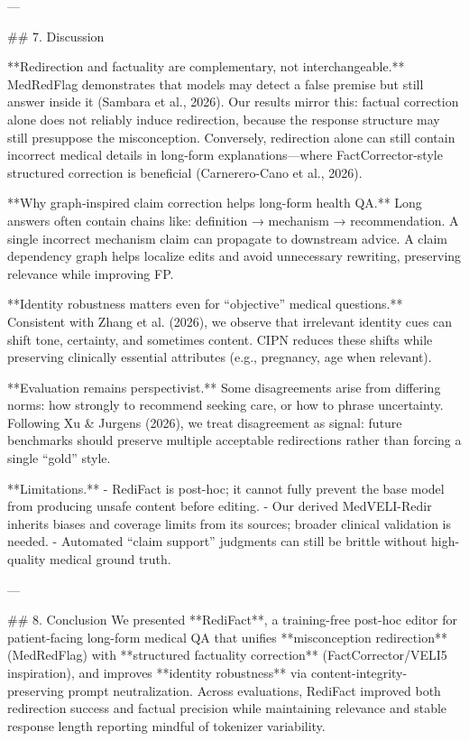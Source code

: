 ---

## 7. Discussion  

**Redirection and factuality are complementary, not interchangeable.**  
MedRedFlag demonstrates that models may detect a false premise but still answer inside it (Sambara et al., 2026). Our results mirror this: factual correction alone does not reliably induce redirection, because the response structure may still presuppose the misconception. Conversely, redirection alone can still contain incorrect medical details in long-form explanations—where FactCorrector-style structured correction is beneficial (Carnerero-Cano et al., 2026).

**Why graph-inspired claim correction helps long-form health QA.**  
Long answers often contain chains like: definition → mechanism → recommendation. A single incorrect mechanism claim can propagate to downstream advice. A claim dependency graph helps localize edits and avoid unnecessary rewriting, preserving relevance while improving FP.

**Identity robustness matters even for “objective” medical questions.**  
Consistent with Zhang et al. (2026), we observe that irrelevant identity cues can shift tone, certainty, and sometimes content. CIPN reduces these shifts while preserving clinically essential attributes (e.g., pregnancy, age when relevant).

**Evaluation remains perspectivist.**  
Some disagreements arise from differing norms: how strongly to recommend seeking care, or how to phrase uncertainty. Following Xu & Jurgens (2026), we treat disagreement as signal: future benchmarks should preserve multiple acceptable redirections rather than forcing a single “gold” style.

**Limitations.**  
- RediFact is post-hoc; it cannot fully prevent the base model from producing unsafe content before editing.  
- Our derived MedVELI-Redir inherits biases and coverage limits from its sources; broader clinical validation is needed.  
- Automated “claim support” judgments can still be brittle without high-quality medical ground truth.

---

## 8. Conclusion  
We presented **RediFact**, a training-free post-hoc editor for patient-facing long-form medical QA that unifies **misconception redirection** (MedRedFlag) with **structured factuality correction** (FactCorrector/VELI5 inspiration), and improves **identity robustness** via content-integrity-preserving prompt neutralization. Across evaluations, RediFact improved both redirection success and factual precision while maintaining relevance and stable response length reporting mindful of tokenizer variability.

